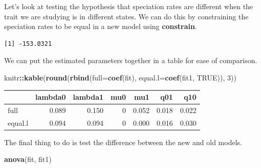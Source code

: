 \documentclass[
]{book}
\newenvironment{Shaded}{\begin{snugshade}}{\end{snugshade}}
\newcommand{\DataTypeTok}[1]{\textcolor[rgb]{0.13,0.29,0.53}{#1}}
\newcommand{\DecValTok}[1]{\textcolor[rgb]{0.00,0.00,0.81}{#1}}
\newcommand{\KeywordTok}[1]{\textcolor[rgb]{0.13,0.29,0.53}{\textbf{#1}}}
\newcommand{\NormalTok}[1]{#1}
\newcommand{\OperatorTok}[1]{\textcolor[rgb]{0.81,0.36,0.00}{\textbf{#1}}}
\newcommand{\OtherTok}[1]{\textcolor[rgb]{0.56,0.35,0.01}{#1}}
\newcommand{\StringTok}[1]{\textcolor[rgb]{0.31,0.60,0.02}{#1}}
\begin{document}
Let's look at testing the hypothesis that speciation rates are different when the trait we are studying is in different states. We can do this by constraining the speciation rates to be equal in a new model using \textbf{constrain}.

\begin{Shaded}
\end{Shaded}

\begin{verbatim}
[1] -153.0321
\end{verbatim}

We can put the estimated parameters together in a table for ease of comparison.

\begin{Shaded}
\begin{Highlighting}[]
\NormalTok{knitr}\OperatorTok{::}\KeywordTok{kable}\NormalTok{(}\KeywordTok{round}\NormalTok{(}\KeywordTok{rbind}\NormalTok{(}\DataTypeTok{full=}\KeywordTok{coef}\NormalTok{(fit), }\DataTypeTok{equal.l=}\KeywordTok{coef}\NormalTok{(fit1, }\OtherTok{TRUE}\NormalTok{)), }\DecValTok{3}\NormalTok{))}
\end{Highlighting}
\end{Shaded}

\begin{tabular}{l|r|r|r|r|r|r}
\hline
  & lambda0 & lambda1 & mu0 & mu1 & q01 & q10\\
\hline
full & 0.089 & 0.150 & 0 & 0.052 & 0.018 & 0.022\\
\hline
equal.l & 0.094 & 0.094 & 0 & 0.000 & 0.016 & 0.030\\
\hline
\end{tabular}

The final thing to do is test the difference between the new and old models.

\begin{Shaded}
\begin{Highlighting}[]
\KeywordTok{anova}\NormalTok{(fit, fit1)}
\end{Highlighting}
\end{Shaded}
\end{document}
